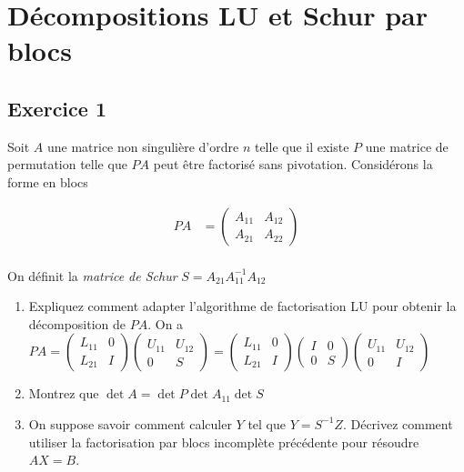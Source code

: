 \documentclass{article}
\begin{document}
\section{Décompositions LU et Schur par blocs}

\subsection{Exercice 1}

Soit $A$ une matrice non singulière d'ordre $n$ telle que il existe $P$ une matrice de permutation telle que $PA$ peut être factorisé sans pivotation.
Considérons la forme en blocs

\begin{align*}
    PA &= \begin{pmatrix} A_{11} & A_{12} \\ A_{21} & A_{22} \end{pmatrix}  \\
\end{align*}

On définit la \emph{matrice de Schur} $S = A_{21} A_{11}^{-1} A_{12}$

\begin{enumerate}
    \item Expliquez comment adapter l'algorithme de factorisation LU pour obtenir la décomposition de $PA$. On a $PA = \begin{pmatrix} L_{11} & 0 \\ L_{21} & I \end{pmatrix} \begin{pmatrix} U_{11} & U_{12} \\ 0 & S \end{pmatrix} = \begin{pmatrix} L_{11} & 0 \\ L_{21} & I \end{pmatrix} \begin{pmatrix} I & 0 \\ 0 & S \end{pmatrix} \begin{pmatrix} U_{11} & U_{12} \\ 0 & I \end{pmatrix} $
    \item Montrez que $\det A = \det P \det A_{11} \det S$
    \item On suppose savoir comment calculer $Y$ tel que $Y = S^{-1} Z$. Décrivez comment utiliser la factorisation par blocs incomplète précédente pour résoudre $AX=B$.
\end{enumerate}
\end{document}
